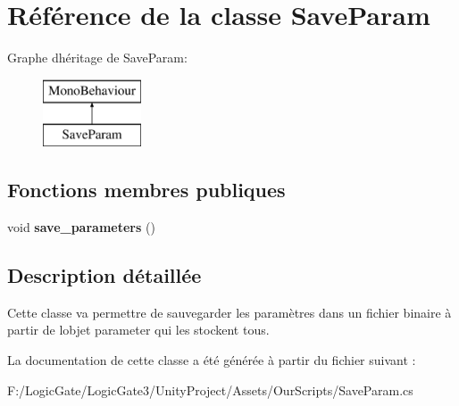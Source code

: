 \hypertarget{class_save_param}{}\section{Référence de la classe Save\+Param}
\label{class_save_param}
Graphe d\textquotesingle{}héritage de Save\+Param\+:\begin{figure}[H]
\begin{center}
\leavevmode
\includegraphics[height=2.000000cm]{class_save_param}
\end{center}
\end{figure}
\subsection*{Fonctions membres publiques}
\begin{DoxyCompactItemize}
\item 
\mbox{\label{class_save_param_ae519af3046e225fef106733029d8b774}} 
void {\bfseries save\+\_\+parameters} ()
\end{DoxyCompactItemize}


\subsection{Description détaillée}
Cette classe va permettre de sauvegarder les paramètres dans un fichier binaire à partir de l\textquotesingle{}objet parameter qui les stockent tous. 

La documentation de cette classe a été générée à partir du fichier suivant \+:\begin{DoxyCompactItemize}
\item 
F\+:/\+Logic\+Gate/\+Logic\+Gate3/\+Unity\+Project/\+Assets/\+Our\+Scripts/Save\+Param.\+cs\end{DoxyCompactItemize}
